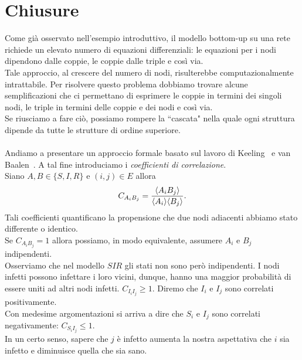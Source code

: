 \section{Chiusure}
Come gi\`a osservato nell'esempio introduttivo, il modello bottom-up su una rete richiede un elevato numero di equazioni differenziali: le equazioni per i nodi dipendono dalle coppie, le coppie dalle triple e cos\`i via.\\
Tale approccio, al crescere del numero di nodi, risulterebbe computazionalmente intrattabile. Per risolvere questo problema dobbiamo trovare alcune semplificazioni che ci permettano di esprimere le coppie in termini dei singoli nodi, le triple in termini delle coppie e dei nodi e cos\`i via.\\
Se riusciamo a fare ci\`o, possiamo rompere la ``cascata" nella quale ogni struttura dipende da tutte le strutture di ordine superiore.\\ \\
Andiamo a presentare un approccio formale basato sul lavoro di Keeling~\cite{keeling1995ecology}  e van Baalen~\cite{van2000pair}.  A tal fine introduciamo i  \textit{coefficienti di correlazione}.\\
Siano $A, B\in \{ S, I,R\}$ e $(i,j)\in E$ allora 
$$C_{A_i B_j} = \frac{\langle A_i B_j \rangle}{\langle A_i \rangle \langle B_j \rangle}.$$
Tali coefficienti quantificano la propensione che due nodi adiacenti abbiamo stato differente o identico.\\
Se $C_{A_iB_j}=1$ allora possiamo, in modo equivalente, assumere  $A_i$ e $B_j$ indipendenti.\\
Osserviamo che nel modello $SIR$ gli stati non sono per\`o indipendenti. I nodi infetti possono infettare i loro vicini, dunque, hanno una maggior probabilit\`a di essere uniti ad altri nodi infetti. $C_{I_i I_j}\geq 1$.  Diremo che $I_i$ e $I_j$ sono correlati positivamente.\\
Con medesime argomentazioni si arriva a dire che $S_i$ e $I_j$ sono correlati negativamente: $C_{S_i I_j}\leq 1$.\\
 In un certo senso, sapere che $j$ \`e infetto aumenta la nostra aspettativa  che $i$ sia infetto e diminuisce quella che sia sano.\\
  
